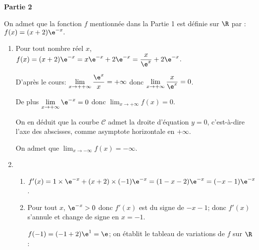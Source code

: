 \medskip

\begin{center}\textbf{Partie 2}\end{center}

\smallskip

On admet que la fonction $f$ mentionnée dans la Partie 1 est définie sur $\R$ par :
$f(x) = (x + 2)\e^{-x}.$
%
%

\medskip

\begin{enumerate}
\item Pour tout nombre réel $x$, $f(x) = (x + 2)\e^{-x}=x\e^{-x}+2\e^{-x}
= \dfrac{x}{\e^{x}}+ 2\e^{-x}$.


D'après le cours: $\displaystyle\lim_{x \to ++ \infty} \dfrac{\e^{x}}{x}= +\infty$ donc  $\displaystyle\lim_{x \to + \infty} \dfrac{x}{\e^{x}}= 0$.

De plus $\displaystyle\lim_{x \to + \infty} \e^{-x}= 0$ donc $\displaystyle\lim_{x \to + \infty} f(x) = 0$.


On en déduit que la courbe $\mathcal{C}$ admet la droite d'équation $y=0$, c'est-à-dire l'axe des abscisses, comme asymptote horizontale en $+\infty$.

On admet que $\displaystyle\lim_{x \to - \infty} f(x) = - \infty$.
\item 
	\begin{enumerate}
		\item%
$f'(x)=1\times \e^{-x} + (x+2)\times (-1)\e^{-x} = (1-x-2) \e^{-x}=(-x-1)\e^{-x}$. 		
		
		\item%
Pour tout $x$, $\e^{-x}>0$ donc $f'(x)$ est du signe de $-x-1$; donc $f'(x)$ s'annule et change de signe en $x=-1$.

$f(-1) = (-1+2)\e^{1}=\e$; on établit le tableau de variations de $f$ sur $\R$:


\end{enumerate}
\end{enumerate}

